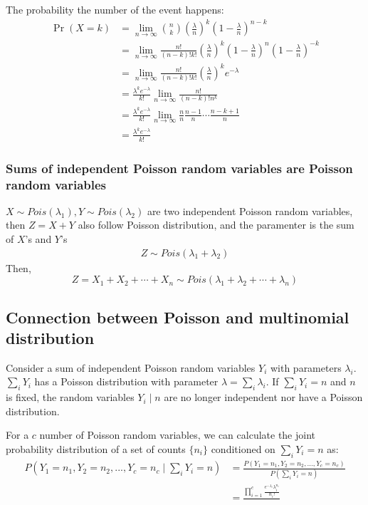 \documentclass[11pt]{elegantbook}
\begin{document}
The probability the number of the event happens:
\begin{equation}
    \begin{aligned}
        \Pr(X=k)&=\lim_{n \rightarrow\infty} \binom{n}{k} (\frac{\lambda}{n})^k(1-\frac{\lambda}{n})^{n-k}\\
        &=\lim_{n \rightarrow\infty} \frac{n!}{(n-k)!k!} (\frac{\lambda}{n})^k(1-\frac{\lambda}{n})^{n}(1-\frac{\lambda}{n})^{-k}\\
        &=\lim_{n \rightarrow\infty}\frac{n!}{(n-k)!k!} (\frac{\lambda}{n})^k e^{-\lambda}\\
        &=\frac{\lambda^k e^{-\lambda}}{k!}\lim_{n \rightarrow\infty}\frac{n!}{(n-k)!n^k}\\
        &=\frac{\lambda^k e^{-\lambda}}{k!}\lim_{n \rightarrow\infty}
        \frac{n}{n}\frac{n-1}{n}\cdots \frac{n-k+1}{n}\\
        &=\frac{\lambda^k e^{-\lambda}}{k!}
    \end{aligned}
    \nonumber
\end{equation}

\subsubsection*{Sums of independent Poisson random variables are Poisson random variables}
$X\sim Pois(\lambda_1), Y\sim Pois(\lambda_2)$ are two independent Poisson random variables, then $Z=X+Y$ also follow Poisson distribution, and the paramenter is the sum of $X$'s and $Y$'s
\begin{equation}
    \begin{aligned}
        Z\sim Pois(\lambda_1+\lambda_2)
    \end{aligned}
    \nonumber
\end{equation}
Then, $$Z=X_1+X_2+\cdots+X_n\sim Pois(\lambda_1+\lambda_2+\cdots+\lambda_n)$$

\subsection{Connection between Poisson and multinomial distribution}
Consider a sum of independent Poisson random variables $Y_i$ with parameters $\lambda_i$. $\sum_i Y_i$ has a Poisson distribution with parameter $\lambda=\sum_i \lambda_i$. If $\sum_i Y_i=n$ and $n$ is fixed, the random variables $Y_i\mid n$ are no longer independent nor have a Poisson distribution.

For a $c$ number of Poisson random variables, we can calculate the joint probability distribution of a set of counts $\{n_i\}$ conditioned on $\sum_i Y_i=n$ as:
\begin{equation}
    \begin{aligned}
        P(Y_1 = n_1,Y_2 = n_2,...,Y_c = n_c\mid \sum_i Y_i=n) &=\frac{P(Y_1 = n_1,Y_2 = n_2,...,Y_c = n_c)}{P(\sum_i Y_i=n)}\\
        &=\frac{\prod_{i=1}^c \frac{e^{-\lambda_i} \lambda_i^{n_i}}{n_i !}}{}
    \end{aligned}
    \nonumber
\end{equation}
\end{document}

